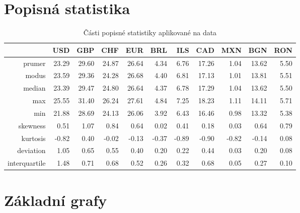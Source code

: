 \documentclass[a4paper]{ article}
\begin{document}
\section{Popisná statistika}
\begin{table}[ht]
\centering
\begin{tabular}{rrrrrrrrrrr}
  \hline
 & USD & GBP & CHF & EUR & BRL & ILS & CAD & MXN & BGN & RON \\ 
  \hline
prumer & 23.29 & 29.60 & 24.87 & 26.64 & 4.34 & 6.76 & 17.26 & 1.04 & 13.62 & 5.50 \\ 
  modus & 23.59 & 29.36 & 24.28 & 26.68 & 4.40 & 6.81 & 17.13 & 1.01 & 13.81 & 5.51 \\ 
  median & 23.39 & 29.47 & 24.80 & 26.64 & 4.37 & 6.78 & 17.29 & 1.04 & 13.62 & 5.50 \\ 
  max & 25.55 & 31.40 & 26.24 & 27.61 & 4.84 & 7.25 & 18.23 & 1.11 & 14.11 & 5.71 \\ 
  min & 21.88 & 28.69 & 24.13 & 26.06 & 3.92 & 6.43 & 16.46 & 0.98 & 13.32 & 5.38 \\ 
  skewness & 0.51 & 1.07 & 0.84 & 0.64 & 0.02 & 0.41 & 0.18 & 0.03 & 0.64 & 0.79 \\ 
  kurtosis & -0.82 & 0.40 & -0.02 & -0.13 & -0.37 & -0.89 & -0.90 & -0.82 & -0.14 & 0.08 \\ 
  deviation & 1.05 & 0.65 & 0.55 & 0.40 & 0.20 & 0.22 & 0.44 & 0.03 & 0.20 & 0.08 \\ 
  interquartile & 1.48 & 0.71 & 0.68 & 0.52 & 0.26 & 0.32 & 0.68 & 0.05 & 0.27 & 0.10 \\ 
   \hline
\end{tabular}
\caption{Části popisné statistiky aplikované na data} 
\label{table:popisStat}
\end{table}\clearpage

\section{Základní grafy}
\end{document}
